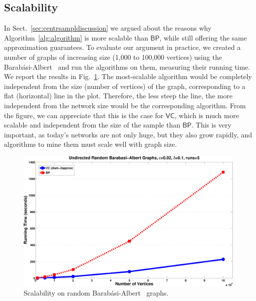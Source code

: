 \subsection{Scalability}\label{sec:centrsamplscalability}

In Sect.~\ref{sec:centrsampldiscussion} we argued about the reasons why
Algorithm~\ref{alg:algorithm} is more scalable than $\mathsf{BP}$, while still
offering the same approximation guarantees. To evaluate our argument in practice, we
created a number of graphs of increasing size (1,000 to 100,000 vertices) using
the Barab\'asi-Albert~\citep{BarabasiA99} and run the algorithms on them,
measuring their running time. We report the results in Fig.~\ref{fig:centrsamplrandom:time}.
The most-scalable algorithm would be completely independent from the size
(number of vertices) of the graph, corresponding to a flat (horizontal) line in
the plot. Therefore, the less steep the line, the more independent from the
network size would be the corresponding algorithm. From the figure, we can
appreciate that this is the case for $\mathsf{VC}$, which is much more scalable
and independent from the size of the sample than $\mathsf{BP}$. This is very
important, as today's networks are not only huge, but they also grow rapidly,
and algorithms to mine them must scale well with graph size.
\begin{figure}[htb]
  \centering
  \includegraphics[width=.5\textwidth,keepaspectratio]{centrsampl/figures/eps/random-time}
  \caption{Scalability on random Barab\'asi-Albert~\citep{BarabasiA99} graphs.}
  \label{fig:centrsamplrandom:time}
\end{figure}


